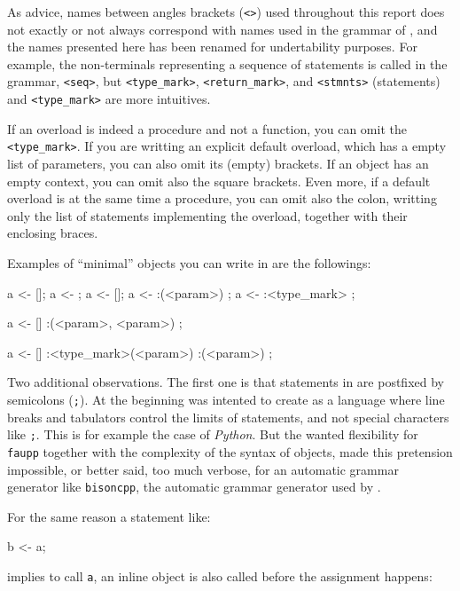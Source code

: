 \documentclass{article}
\begin{document}
As advice, names between angles brackets (\texttt{<>}) used throughout this
report does not exactly or not always correspond with names used in the grammar
of \faupp, and the names presented here has been renamed for undertability
purposes. For example, the non-terminals representing a sequence of
statements is called in the \faupp grammar, \texttt{<seq>}, but
\texttt{<type\_mark>}, \texttt{<return\_mark>}, and \texttt{<stmnts>} (statements)
and \texttt{<type\_mark>} are more intuitives.

If an overload is indeed a procedure and not a function, you can omit the
\texttt{<type\_mark>}. If you are writting an explicit default overload, which
has a empty list of parameters, you can also omit its (empty) brackets. If an
object has an empty context, you can omit also the square brackets. Even more,
if a default overload is at the same time a procedure, you can omit also the
colon, writting only the list of statements implementing the overload, together
with their enclosing braces.

Examples of ``minimal'' objects you can write in \faupp are the followings:

\begin{faupp2}
  a <- [];
  a <- {};
  a <- []{};
  a <- :(<param>) {};
  a <- :<type_mark> {};

  a <- [] :(<param>, <param>)
           {};

  a <- [] :<type_mark>(<param>)
           {}
          :(<param>)
           {};
\end{faupp2}

Two additional observations. The first one is that statements in \faupp are
postfixed by semicolons (\texttt{;}). At the beginning was intented to create
\faupp as a language where line breaks and tabulators control the limits of
statements, and not special characters like \texttt{;}. This is for example the
case of \textit{Python}. But the wanted flexibility for \texttt{faupp} together
with the complexity of the syntax of objects, made this pretension impossible, or
better said, too much verbose, for an automatic grammar generator like
\texttt{bisoncpp}, the automatic grammar generator used by \fav.

For the same reason a statement like:

\begin{faupp2}
  b <- a;
\end{faupp2}

implies to call \texttt{a}, an inline object is also called before the
assignment happens:
\end{document}
